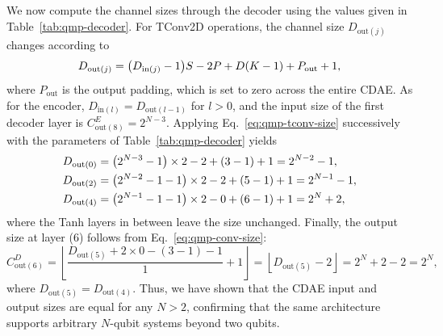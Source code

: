 We now compute the channel sizes through the decoder using the values given in Table~\ref{tab:qmp-decoder}. For TConv2D operations, the channel size $D_{\mathrm{out}(j)}$ changes according to~\cite{dumoulin2018}
\begin{equation}
\label{eq:qmp-tconv-size}
D_{\mathrm{out}(j)} = \qty( D_{\mathrm{in}(j)} - 1 ) S - 2P + D(K-1) + P_{\mathrm{out}} + 1,
\end{equation}
where $P_{\mathrm{out}}$ is the output padding, which is set to zero across the entire CDAE. As for the encoder, $D_{\mathrm{in}(l)} = D_{\mathrm{out}(l-1)}$ for $l > 0$, and the input size of the first decoder layer is $C^{E}_{\mathrm{out}(8)} = 2^{N-3}$. Applying Eq.~\eqref{eq:qmp-tconv-size} successively with the parameters of Table~\ref{tab:qmp-decoder} yields
\begin{align}
D_{\mathrm{out}(0)} &= \qty(2^{N-3} - 1) \times 2 - 2 + (3-1) + 1 = 2^{N-2} - 1, \\
D_{\mathrm{out}(2)} &= \qty(2^{N-2} - 1 - 1) \times 2 - 2 + (5-1) + 1 = 2^{N-1} - 1, \\
D_{\mathrm{out}(4)} &= \qty(2^{N-1} - 1 - 1) \times 2 - 0 + (6-1) + 1 = 2^{N} + 2,
\end{align}
where the Tanh layers in between leave the size unchanged. Finally, the output size at layer (6) follows from Eq.~\eqref{eq:qmp-conv-size}:
\begin{equation}
C^{D}_{\mathrm{out}(6)} = \left\lfloor \frac{D_{\mathrm{out}(5)} + 2 \times 0 - (3-1) - 1}{1} + 1 \right\rfloor
= \left\lfloor D_{\mathrm{out}(5)} - 2 \right\rfloor = 2^N + 2 - 2 = 2^N,
\end{equation}
where $D_{\mathrm{out}(5)} = D_{\mathrm{out}(4)}$. Thus, we have shown that the CDAE input and output sizes are equal for any $N > 2$, confirming that the same architecture supports arbitrary $N$-qubit systems beyond two qubits.
